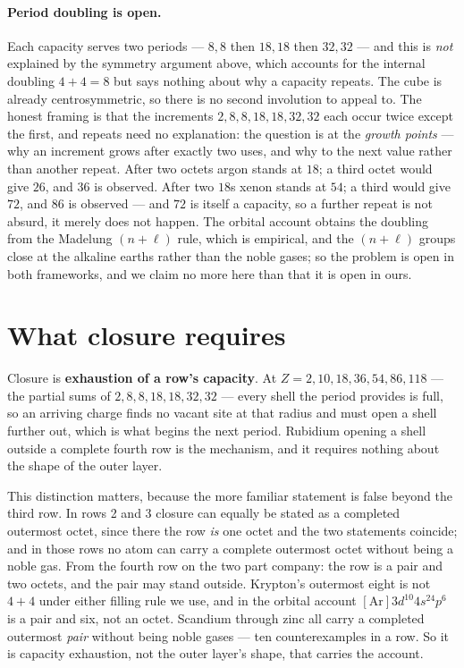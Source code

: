 \paragraph{Period doubling is open.}
Each capacity serves two periods --- $8,8$ then $18,18$ then $32,32$ --- and this is \emph{not}
explained by the symmetry argument above, which accounts for the internal doubling $4{+}4=8$ but
says nothing about why a capacity repeats. The cube is already centrosymmetric, so there is no
second involution to appeal to. The honest framing is that the increments $2,8,8,18,18,32,32$ each
occur twice except the first, and repeats need no explanation: the question is at the
\emph{growth points} --- why an increment grows after exactly two uses, and why to the next value
rather than another repeat. After two octets argon stands at $18$; a third octet would give $26$,
and $36$ is observed. After two $18$s xenon stands at $54$; a third would give $72$, and $86$ is
observed --- and $72$ is itself a capacity, so a further repeat is not absurd, it merely does not
happen. The orbital account obtains the doubling from the Madelung $(n{+}\ell)$ rule, which is
empirical, and the $(n{+}\ell)$ groups close at the alkaline earths rather than the noble gases;
so the problem is open in both frameworks, and we claim no more here than that it is open in ours.

\section{What closure requires}\label{sec:closure}

Closure is \textbf{exhaustion of a row's capacity}. At $Z = 2, 10, 18, 36, 54, 86, 118$ --- the
partial sums of $2, 8, 8, 18, 18, 32, 32$ --- every shell the period provides is full, so an
arriving charge finds no vacant site at that radius and must open a shell further out, which is
what begins the next period. Rubidium opening a shell outside a complete fourth row is the
mechanism, and it requires nothing about the shape of the outer layer.

This distinction matters, because the more familiar statement is false beyond the third row.
In rows 2 and 3 closure can equally be stated as a completed outermost octet, since there the row
\emph{is} one octet and the two statements coincide; and in those rows no atom can carry a complete
outermost octet without being a noble gas. From the fourth row on the two part company: the row is
a pair and two octets, and the pair may stand outside. Krypton's outermost eight is not $4{+}4$
under either filling rule we use, and in the orbital account $[\mathrm{Ar}]3d^{10}4s^24p^6$ is a
pair and six, not an octet. Scandium through zinc all carry a completed outermost \emph{pair}
without being noble gases --- ten counterexamples in a row. So it is capacity exhaustion, not the
outer layer's shape, that carries the account.

